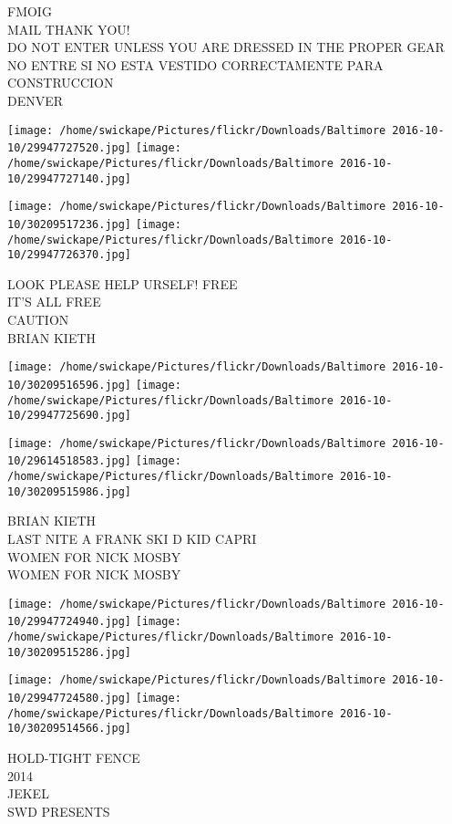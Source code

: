 \documentclass[10pt,letterpaper]{article}
\begin{document}
FMOIG\\
MAIL THANK YOU!\\
DO NOT ENTER UNLESS YOU ARE DRESSED IN THE PROPER GEAR NO ENTRE SI NO ESTA VESTIDO CORRECTAMENTE PARA CONSTRUCCION\\
DENVER\\
\pagebreak

\texttt{[image: /home/swickape/Pictures/flickr/Downloads/Baltimore 2016-10-10/29947727520.jpg]}
\texttt{[image: /home/swickape/Pictures/flickr/Downloads/Baltimore 2016-10-10/29947727140.jpg]}

\texttt{[image: /home/swickape/Pictures/flickr/Downloads/Baltimore 2016-10-10/30209517236.jpg]}
\texttt{[image: /home/swickape/Pictures/flickr/Downloads/Baltimore 2016-10-10/29947726370.jpg]}

LOOK PLEASE HELP URSELF!  FREE\\
IT'S ALL FREE\\
CAUTION\\
BRIAN KIETH\\
\pagebreak

\texttt{[image: /home/swickape/Pictures/flickr/Downloads/Baltimore 2016-10-10/30209516596.jpg]}
\texttt{[image: /home/swickape/Pictures/flickr/Downloads/Baltimore 2016-10-10/29947725690.jpg]}

\texttt{[image: /home/swickape/Pictures/flickr/Downloads/Baltimore 2016-10-10/29614518583.jpg]}
\texttt{[image: /home/swickape/Pictures/flickr/Downloads/Baltimore 2016-10-10/30209515986.jpg]}

BRIAN KIETH\\
LAST NITE A FRANK SKI D KID CAPRI\\
WOMEN FOR NICK MOSBY\\
WOMEN FOR NICK MOSBY\\
\pagebreak

\texttt{[image: /home/swickape/Pictures/flickr/Downloads/Baltimore 2016-10-10/29947724940.jpg]}
\texttt{[image: /home/swickape/Pictures/flickr/Downloads/Baltimore 2016-10-10/30209515286.jpg]}

\texttt{[image: /home/swickape/Pictures/flickr/Downloads/Baltimore 2016-10-10/29947724580.jpg]}
\texttt{[image: /home/swickape/Pictures/flickr/Downloads/Baltimore 2016-10-10/30209514566.jpg]}

HOLD{-}TIGHT FENCE\\
2014\\
JEKEL\\
SWD PRESENTS\\
\pagebreak
\end{document}
